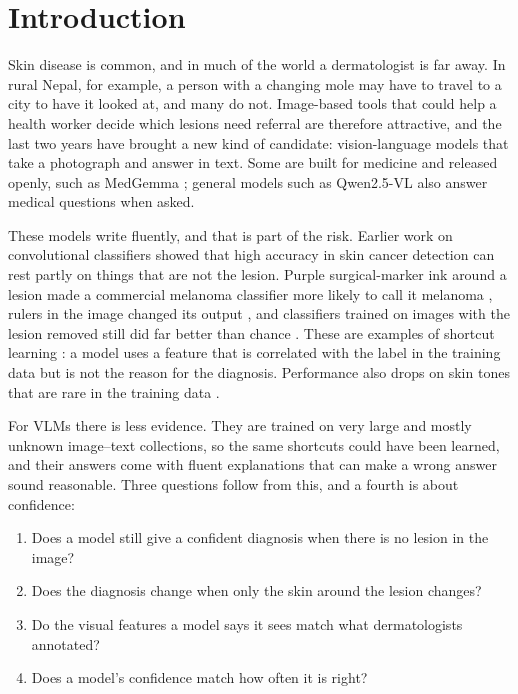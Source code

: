 \documentclass[11pt,a4paper]{article}
\begin{document}
\section{Introduction}

Skin disease is common, and in much of the world a dermatologist is far away. In rural Nepal, for example, a person with a changing mole may have to travel to a city to have it looked at, and many do not. Image-based tools that could help a health worker decide which lesions need referral are therefore attractive, and the last two years have brought a new kind of candidate: vision-language models that take a photograph and answer in text. Some are built for medicine and released openly, such as MedGemma \cite{medgemma2025}; general models such as Qwen2.5-VL \cite{qwen25vl2025} also answer medical questions when asked.

These models write fluently, and that is part of the risk. Earlier work on convolutional classifiers showed that high accuracy in skin cancer detection can rest partly on things that are not the lesion. Purple surgical-marker ink around a lesion made a commercial melanoma classifier more likely to call it melanoma \cite{winkler2019}, rulers in the image changed its output \cite{winkler2021}, and classifiers trained on images with the lesion removed still did far better than chance \cite{bissoto2019}. These are examples of shortcut learning \cite{geirhos2020}: a model uses a feature that is correlated with the label in the training data but is not the reason for the diagnosis. Performance also drops on skin tones that are rare in the training data \cite{daneshjou2022}.

For VLMs there is less evidence. They are trained on very large and mostly unknown image--text collections, so the same shortcuts could have been learned, and their answers come with fluent explanations that can make a wrong answer sound reasonable. Three questions follow from this, and a fourth is about confidence:
\begin{enumerate}[label=\textbf{Q\arabic*.}]
  \item Does a model still give a confident diagnosis when there is no lesion in the image?
  \item Does the diagnosis change when only the skin around the lesion changes?
  \item Do the visual features a model says it sees match what dermatologists annotated?
  \item Does a model's confidence match how often it is right?
\end{enumerate}
\end{document}
